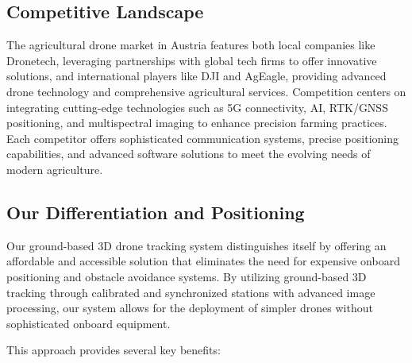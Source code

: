 \subsection{Competitive Landscape}

The agricultural drone market in Austria features both local companies like Dronetech, leveraging partnerships with global tech firms to offer innovative solutions, and international players like DJI and AgEagle, providing advanced drone technology and comprehensive agricultural services. Competition centers on integrating cutting-edge technologies such as 5G connectivity, AI, RTK/GNSS positioning, and multispectral imaging to enhance precision farming practices. Each competitor offers sophisticated communication systems, precise positioning capabilities, and advanced software solutions to meet the evolving needs of modern agriculture.

\subsection{Our Differentiation and Positioning}

Our ground-based 3D drone tracking system distinguishes itself by offering an affordable and accessible solution that eliminates the need for expensive onboard positioning and obstacle avoidance systems. By utilizing ground-based 3D tracking through calibrated and synchronized stations with advanced image processing, our system allows for the deployment of simpler drones without sophisticated onboard equipment.

This approach provides several key benefits:

